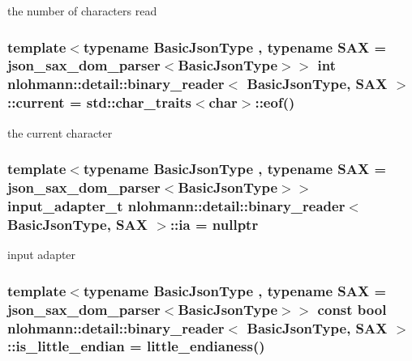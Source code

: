 the number of characters read 

\subsubsection[{\texorpdfstring{current}{current}}]{\setlength{\rightskip}{0pt plus 5cm}template$<$typename Basic\+Json\+Type , typename S\+AX  = json\+\_\+sax\+\_\+dom\+\_\+parser$<$\+Basic\+Json\+Type$>$$>$ int {\bf nlohmann\+::detail\+::binary\+\_\+reader}$<$ Basic\+Json\+Type, S\+AX $>$\+::current = std\+::char\+\_\+traits$<$char$>$\+::eof()\hspace{0.3cm}{\ttfamily [private]}}\hypertarget{classnlohmann_1_1detail_1_1binary__reader_aadd621ccddf3539f2ed4e2038d531870}{}\label{classnlohmann_1_1detail_1_1binary__reader_aadd621ccddf3539f2ed4e2038d531870}


the current character 

\subsubsection[{\texorpdfstring{ia}{ia}}]{\setlength{\rightskip}{0pt plus 5cm}template$<$typename Basic\+Json\+Type , typename S\+AX  = json\+\_\+sax\+\_\+dom\+\_\+parser$<$\+Basic\+Json\+Type$>$$>$ {\bf input\+\_\+adapter\+\_\+t} {\bf nlohmann\+::detail\+::binary\+\_\+reader}$<$ Basic\+Json\+Type, S\+AX $>$\+::ia = nullptr\hspace{0.3cm}{\ttfamily [private]}}\hypertarget{classnlohmann_1_1detail_1_1binary__reader_a21ceb754c46a4920b966be7de48c34ad}{}\label{classnlohmann_1_1detail_1_1binary__reader_a21ceb754c46a4920b966be7de48c34ad}


input adapter 

\subsubsection[{\texorpdfstring{is\+\_\+little\+\_\+endian}{is_little_endian}}]{\setlength{\rightskip}{0pt plus 5cm}template$<$typename Basic\+Json\+Type , typename S\+AX  = json\+\_\+sax\+\_\+dom\+\_\+parser$<$\+Basic\+Json\+Type$>$$>$ const bool {\bf nlohmann\+::detail\+::binary\+\_\+reader}$<$ Basic\+Json\+Type, S\+AX $>$\+::is\+\_\+little\+\_\+endian = {\bf little\+\_\+endianess}()\hspace{0.3cm}{\ttfamily [private]}}\hypertarget{classnlohmann_1_1detail_1_1binary__reader_aa846bdda08720535b26d8c90b939bc37}{}\label{classnlohmann_1_1detail_1_1binary__reader_aa846bdda08720535b26d8c90b939bc37}


